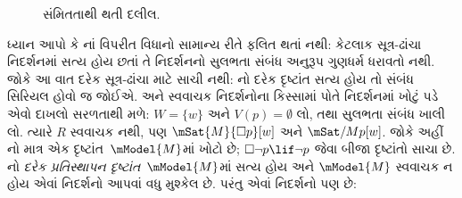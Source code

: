 \begin{figure}
  \begin{center}
  \end{center}
\caption{સંમિતતાથી થતી દલીલ.}
\end{figure}

ધ્યાન આપો કે નાં વિપરીત
વિધાનો સામાન્ય રીતે ફલિત થતાં નથી: કેટલાક સૂત્ર-ઢાંચા
નિદર્શનમાં સત્ય હોય છતાં તે નિદર્શનનો સુલભતા સંબંધ
અનુરૂપ ગુણધર્મ ધરાવતો નથી. જોકે આ વાત દરેક સૂત્ર-ઢાંચા
માટે સાચી નથી: નો દરેક દૃષ્ટાંત સત્ય હોય તો સંબંધ
સિરિયલ હોવો જ જોઈએ.  અને સ્વવાચક
નિદર્શનોના કિસ્સામાં  પોતે નિદર્શનમાં ખોટું
પડે એવો દાખલો સરળતાથી મળે: $W = \{w\}$ અને
$V(p) = \emptyset$ લો, તથા સુલભતા સંબંધ ખાલી લો.
ત્યારે $R$ સ્વવાચક નથી, પણ
$\mSat{M}{\Box
  p}[w]$ અને $\mSat/{M}{p}[w]$. જોકે અહીં
નો માત્ર એક દૃષ્ટાંત~$\mModel{M}$માં
ખોટો છે; $\Box \lnot p \lif \lnot p$ જેવા
બીજા દૃષ્ટાંતો સાચા છે. નો
\emph{દરેક પ્રતિસ્થાપન દૃષ્ટાંત}~$\mModel{M}$માં
સત્ય હોય અને $\mModel{M}$ સ્વવાચક ન હોય એવાં
નિદર્શનો આપવાં વધુ મુશ્કેલ છે. પરંતુ એવાં
નિદર્શનો પણ છે:

